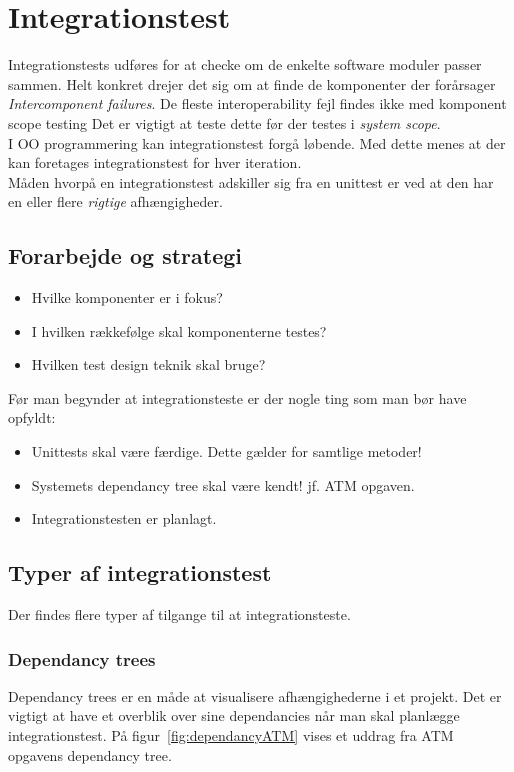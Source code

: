 \section{Integrationstest}
Integrationstests udføres for at checke om de enkelte software moduler passer sammen. Helt konkret drejer det sig om at finde de komponenter der forårsager \textit{Intercomponent failures}. De fleste interoperability fejl findes ikke med komponent scope testing Det er vigtigt at teste dette før der testes i \textit{system scope}.\\

I OO programmering kan integrationstest forgå løbende. Med dette menes at der kan foretages integrationstest for hver iteration. \\

Måden hvorpå en integrationstest adskiller sig fra en unittest er ved at den har en eller flere \textit{rigtige} afhængigheder.

\subsection{Forarbejde og strategi}

\begin{itemize}
	\item Hvilke komponenter er i fokus?
	\item I hvilken rækkefølge skal komponenterne testes?
	\item Hvilken test design teknik skal bruge?
\end{itemize}

Før man begynder at integrationsteste er der nogle ting som man bør have opfyldt:

\begin{itemize}
	\item Unittests skal være færdige. Dette gælder for samtlige metoder!
	\item Systemets dependancy tree skal være kendt! jf. ATM opgaven.
	\item Integrationstesten er planlagt.
\end{itemize}

\subsection{Typer af integrationstest}
Der findes flere typer af tilgange til at integrationsteste.

\subsubsection{Dependancy trees}
Dependancy trees er en måde at visualisere afhængighederne i et projekt. Det er vigtigt at have et overblik over sine dependancies når man skal planlægge integrationstest. På figur~\ref{fig:dependancyATM} vises et uddrag fra ATM opgavens dependancy tree.

